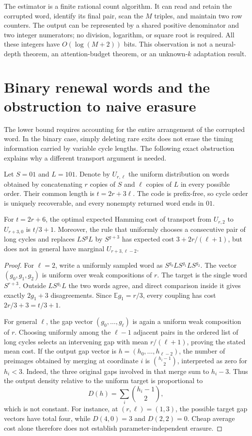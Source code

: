 The estimator is a finite rational count algorithm. It can read and retain the corrupted word, identify its final pair, scan the $M$ triples, and maintain two row counters. The output can be represented by a shared positive denominator and two integer numerators; no division, logarithm, or square root is required. All these integers have $O(\log(M+2))$ bits. This observation is not a neural-depth theorem, an attention-budget theorem, or an unknown-$k$ adaptation result.

\section{Binary renewal words and the obstruction to naive erasure}
\label{bin:obstruction}
The lower bound requires accounting for the entire arrangement of the corrupted word. In the binary case, simply deleting rare exits does not erase the timing information carried by variable cycle lengths. The following exact obstruction explains why a different transport argument is needed.

Let $S=01$ and $L=101$. Denote by $U_{r,\ell}$ the uniform distribution on words obtained by concatenating $r$ copies of $S$ and $\ell$ copies of $L$ in every possible order. Their common length is $t=2r+3\ell$. The code is prefix-free, so cycle order is uniquely recoverable, and every nonempty returned word ends in $01$.

\begin{proposition}
\label{bin:obstructionprop}
For $t=2r+6$, the optimal expected Hamming cost of transport from $U_{r,2}$ to $U_{r+3,0}$ is $t/3+1$. Moreover, the rule that uniformly chooses a consecutive pair of long cycles and replaces $L S^g L$ by $S^{g+3}$ has expected cost $3+2r/(\ell+1)$, but does not in general have marginal $U_{r+3,\ell-2}$.
\end{proposition}
\begin{proof}
For $\ell=2$, write a uniformly sampled word as $S^{g_0}LS^{g_1}LS^{g_2}$. The vector $(g_0,g_1,g_2)$ is uniform over weak compositions of $r$. The target is the single word $S^{r+3}$. Outside $LS^{g_1}L$ the two words agree, and direct comparison inside it gives exactly $2g_1+3$ disagreements. Since $\mathbb E g_1=r/3$, every coupling has cost $2r/3+3=t/3+1$.

For general $\ell$, the gap vector $(g_0,\ldots,g_\ell)$ is again a uniform weak composition of $r$. Choosing uniformly among the $\ell-1$ adjacent pairs in the ordered list of long cycles selects an intervening gap with mean $r/(\ell+1)$, proving the stated mean cost. If the output gap vector is $h=(h_0,\ldots,h_{\ell-2})$, the number of preimages obtained by merging at coordinate $i$ is $\binom{h_i-1}{2}$, interpreted as zero for $h_i<3$. Indeed, the three original gaps involved in that merge sum to $h_i-3$. Thus the output density relative to the uniform target is proportional to
\[
 D(h)=\sum_i\binom{h_i-1}{2},
\]
which is not constant. For instance, at $(r,\ell)=(1,3)$, the possible target gap vectors have total four, while $D(4,0)=3$ and $D(2,2)=0$. Cheap average cost alone therefore does not establish parameter-independent erasure.
\end{proof}

